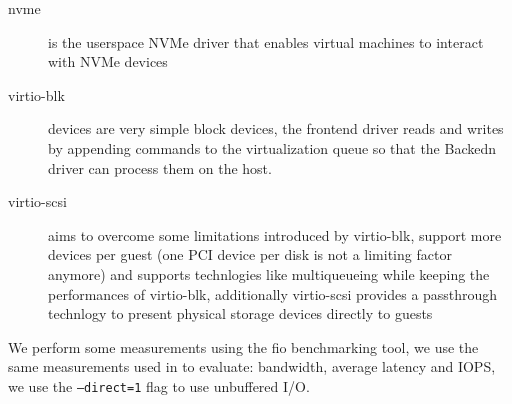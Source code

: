 \documentclass[twocolumn]{article}
\begin{document}
\begin{description}
    \item[nvme] is the userspace NVMe driver that enables virtual machines to interact with NVMe devices
    \item[virtio-blk] devices are very simple block devices, the frontend driver reads and writes by appending commands to the virtualization queue so that the Backedn driver can process them on the host.
    \item[virtio-scsi] aims to overcome some limitations introduced by virtio-blk, support more devices per guest (one PCI device per disk is not a limiting factor anymore) and supports technlogies like multiqueueing while keeping the performances of virtio-blk, additionally virtio-scsi provides a passthrough technlogy to present physical storage devices directly to guests
\end{description}

We perform some measurements using the fio \cite{fio} benchmarking tool, we use the same measurements used in \cite{spool} to evaluate: bandwidth, average latency and IOPS, we use the \texttt{--direct=1} flag to use unbuffered I/O.
\end{document}
